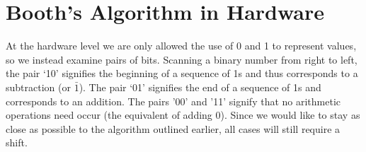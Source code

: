 \documentclass{article}
\begin{document}


\section{Booth's Algorithm in Hardware}
    At the hardware level we are only allowed the use of 0 and 1 to represent values, so we instead examine pairs of bits.
Scanning a binary number from right to left, the pair `10' signifies the beginning of a sequence of 1s and thus corresponds to a subtraction (or $\bar{1}$).
The pair `01' signifies the end of a sequence of 1s and corresponds to an addition.
The pairs '00' and '11' signify that no arithmetic operations need occur (the equivalent of adding 0).
Since we would like to stay as close as possible to the algorithm outlined earlier, all cases will still require a shift.
\end{document}
